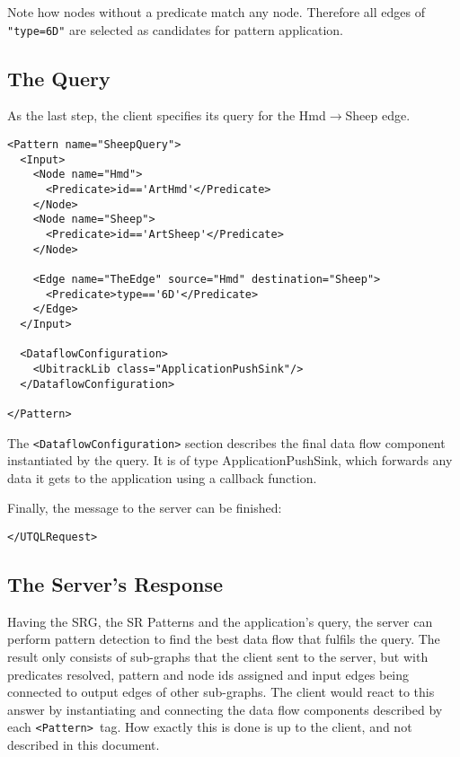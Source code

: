 \documentclass[11pt]{article}
\begin{document}
Note how nodes without a predicate match
any node. Therefore all edges of \texttt{"type=6D"} are selected as candidates for
pattern application.

\subsection{The Query}

As the last step, the client specifies its query for the Hmd$\rightarrow$Sheep edge.

\begin{Verbatim}[fontsize=\footnotesize,tabsize=2] 
<Pattern name="SheepQuery">
  <Input>
    <Node name="Hmd">
      <Predicate>id=='ArtHmd'</Predicate>
    </Node>
    <Node name="Sheep">
      <Predicate>id=='ArtSheep'</Predicate>
    </Node>	

    <Edge name="TheEdge" source="Hmd" destination="Sheep">
      <Predicate>type=='6D'</Predicate>
    </Edge>
  </Input>
 
  <DataflowConfiguration>
    <UbitrackLib class="ApplicationPushSink"/>
  </DataflowConfiguration>

</Pattern>
\end{Verbatim} 

The \texttt{<DataflowConfiguration>} section describes the final data flow component instantiated by the
query. It is of type ApplicationPushSink, which forwards any data it gets to
the application using a callback function.

Finally, the message to the server can be finished:

\begin{Verbatim}[fontsize=\footnotesize,tabsize=2] 
</UTQLRequest>
\end{Verbatim} 

\subsection{The Server's Response}

Having the SRG, the SR Patterns and the
application's query, the server can perform pattern detection to find the best
data flow that fulfils the query. The result only consists of sub-graphs that
the client sent to the server, but with predicates resolved, pattern and node
ids assigned and input edges being connected to output edges of other
sub-graphs. The client would react to this answer by instantiating and
connecting the data flow components described by each 
\texttt{<Pattern> }tag.
How exactly this is done is up to the client, and not described in this
document.
\end{document}
